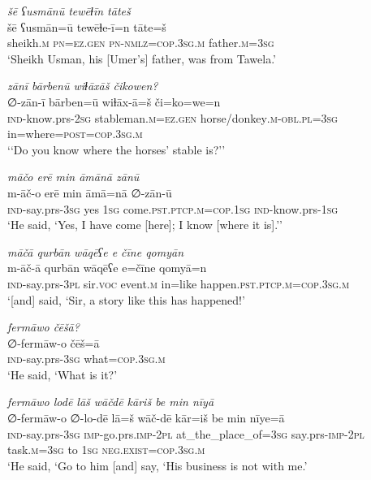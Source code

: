 \ea \label{ŠJ.58}
\textit{šē ʕusmānū tewēɫīn tāteš} \\ 
\gll šē ʕusmān=ū tewēɫe-ī=n tāte=š \\ 
 sheikh\textsc{.m} \textsc{pn}\textsc{=ez.gen} \textsc{pn}\textsc{-nmlz}\textsc{=cop}\textsc{.3sg}\textsc{.m} father\textsc{.m}\textsc{=3sg} \\ 
\glt `Sheikh Usman, his [Umer’s] father, was from Tawela.'
\z 
 
\ea \label{ŠJ.60}
\textit{zānī bārbenū wiɫāxāš čikowen?} \\ 
\gll ∅-zān-ī bārben=ū wiɫāx-ā=š či=ko=we=n \\ 
 \textsc{ind-}know.prs-\textsc{2sg} stableman\textsc{.m}\textsc{=ez.gen} horse/donkey\textsc{.m}\textsc{-obl}\textsc{.pl}\textsc{=3sg} in=where\textsc{=\textsc{post}}\textsc{=cop}\textsc{.3sg}\textsc{.m} \\ 
\glt `‘Do you know where the horses’ stable is?’'
\z 
 
\ea \label{ŠJ.61}
\textit{māčo erē min āmānā zānū} \\ 
\gll m-āč-o erē min āmā=nā ∅-zān-ū \\ 
 \textsc{ind-}say.prs\textsc{-3sg} yes \textsc{1sg} come\textsc{.pst}\textsc{.ptcp}\textsc{.m}\textsc{=cop}\textsc{.\textsc{1sg}} \textsc{ind-}know.prs\textsc{-\textsc{1sg}} \\ 
\glt `He said, ‘Yes, I have come [here]; I know [where it is].’'
\z 
 
\ea \label{ŠJ.69}
\textit{māčā qurbān wāqēʕe e čīne qomyān} \\ 
\gll m-āč-ā qurbān wāqēʕe e=čīne qomyā=n \\ 
 \textsc{ind-}say.prs\textsc{-3pl} sir.\textsc{voc} event\textsc{.m} in=like happen\textsc{.pst}\textsc{.ptcp}\textsc{.m}\textsc{=cop}\textsc{.3sg}\textsc{.m} \\ 
\glt `[and] said, ‘Sir, a story like this has happened!'
\z 
 
\ea \label{ŠJ.70}
\textit{fermāwo čēšā?} \\ 
\gll ∅-fermāw-o čēš=ā \\ 
 \textsc{ind-}say.prs\textsc{-3sg} what\textsc{=cop}\textsc{.3sg}\textsc{.m} \\ 
\glt `He said, ‘What is it?'
\z 
 
\ea \label{ŠJ.74}
\textit{fermāwo lodē lāš wāčdē kāriš be min nīyā} \\ 
\gll ∅-fermāw-o ∅-lo-dē lā=š wāč-dē kār=iš be min nīye=ā \\ 
 \textsc{ind-}say.prs\textsc{-3sg} \textsc{imp-}go.prs.\textsc{imp-}\textsc{2pl} at\_the\_place\_of\textsc{=3sg} say.prs-\textsc{imp-}\textsc{2pl} task\textsc{.m}\textsc{=3sg} to \textsc{1sg} \textsc{\textsc{neg.}exist}\textsc{=cop}\textsc{.3sg}\textsc{.m} \\ 
\glt `He said, ‘Go to him [and] say, ‘His business is not with me.'
\z 
 
